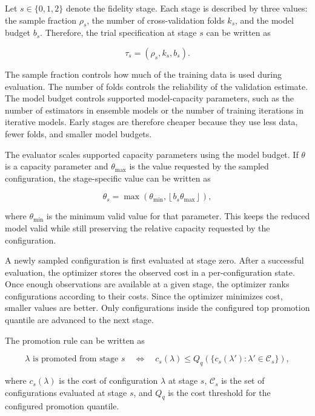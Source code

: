 \documentclass[12pt,a4paper,oneside]{report}
\begin{document}
\noindent Let \(s \in \{0,1,2\}\) denote the fidelity stage. Each stage is described by
three values: the sample fraction \(\rho_s\), the number of cross-validation
folds \(k_s\), and the model budget \(b_s\). Therefore, the trial specification
at stage \(s\) can be written as

\[
\tau_s = (\rho_s, k_s, b_s).
\]

\noindent The sample fraction controls how much of the training data is used during
evaluation. The number of folds controls the reliability of the validation
estimate. The model budget controls supported model-capacity parameters, such as
the number of estimators in ensemble models or the number of training iterations
in iterative models. Early stages are therefore cheaper because they use less
data, fewer folds, and smaller model budgets.

\noindent The evaluator scales supported capacity parameters using the model budget. If
\(\theta\) is a capacity parameter and \(\theta_{\max}\) is the value requested
by the sampled configuration, the stage-specific value can be written as

\[
\theta_s =
\max
\left(
\theta_{\min},
\left\lfloor b_s \theta_{\max} \right\rfloor
\right),
\]

\noindent where \(\theta_{\min}\) is the minimum valid value for that parameter. This keeps
the reduced model valid while still preserving the relative capacity requested
by the configuration.

\noindent A newly sampled configuration is first evaluated at stage zero. After a
successful evaluation, the optimizer stores the observed cost in a
per-configuration state. Once enough observations are available at a given
stage, the optimizer ranks configurations according to their costs. Since the
optimizer minimizes cost, smaller values are better. Only configurations inside
the configured top promotion quantile are advanced to the next stage.

\noindent The promotion rule can be written as

\[
\lambda \text{ is promoted from stage } s
\quad \Longleftrightarrow \quad
c_s(\lambda) \leq Q_q
\left(
\{c_s(\lambda') : \lambda' \in \mathcal{C}_s\}
\right),
\]

\noindent where \(c_s(\lambda)\) is the cost of configuration \(\lambda\) at stage \(s\),
\(\mathcal{C}_s\) is the set of configurations evaluated at stage \(s\), and
\(Q_q\) is the cost threshold for the configured promotion quantile.
\end{document}
